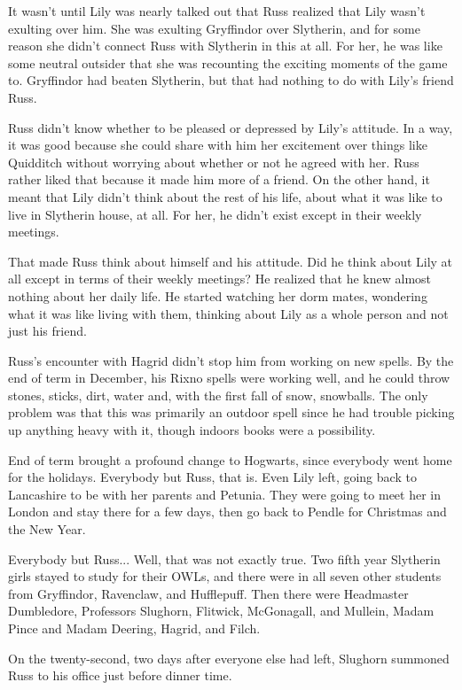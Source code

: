\documentclass[a4paper,11pt]{article}
\begin{document}
It wasn't until Lily was nearly talked out that Russ realized that Lily wasn't exulting over him. She was exulting Gryffindor over Slytherin, and for some reason she didn't connect Russ with Slytherin in this at all. For her, he was like some neutral outsider that she was recounting the exciting moments of the game to. Gryffindor had beaten Slytherin, but that had nothing to do with Lily's friend Russ.

Russ didn't know whether to be pleased or depressed by Lily's attitude. In a way, it was good because she could share with him her excitement over things like Quidditch without worrying about whether or not he agreed with her. Russ rather liked that because it made him more of a friend. On the other hand, it meant that Lily didn't think about the rest of his life, about what it was like to live in Slytherin house, at all. For her, he didn't exist except in their weekly meetings.

That made Russ think about himself and his attitude. Did he think about Lily at all except in terms of their weekly meetings? He realized that he knew almost nothing about her daily life. He started watching her dorm mates, wondering what it was like living with them, thinking about Lily as a whole person and not just his friend.

Russ's encounter with Hagrid didn't stop him from working on new spells. By the end of term in December, his Rixno spells were working well, and he could throw stones, sticks, dirt, water and, with the first fall of snow, snowballs. The only problem was that this was primarily an outdoor spell since he had trouble picking up anything heavy with it, though indoors books were a possibility.

End of term brought a profound change to Hogwarts, since everybody went home for the holidays. Everybody but Russ, that is. Even Lily left, going back to Lancashire to be with her parents and Petunia. They were going to meet her in London and stay there for a few days, then go back to Pendle for Christmas and the New Year.

Everybody but Russ... Well, that was not exactly true. Two fifth year Slytherin girls stayed to study for their OWLs, and there were in all seven other students from Gryffindor, Ravenclaw, and Hufflepuff. Then there were Headmaster Dumbledore, Professors Slughorn, Flitwick, McGonagall, and Mullein, Madam Pince and Madam Deering, Hagrid, and Filch.

On the twenty-second, two days after everyone else had left, Slughorn summoned Russ to his office just before dinner time.
\end{document}
